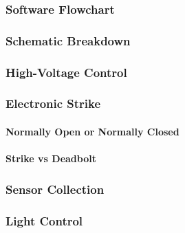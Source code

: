 \subsubsection{Software Flowchart}

\subsubsection{Schematic Breakdown}

\subsubsection{High-Voltage Control}

\subsubsection{Electronic Strike}
\label{sec:electronic-strike}

\paragraph{Normally Open or Normally Closed}

\paragraph{Strike vs Deadbolt}

\subsubsection{Sensor Collection}

\subsubsection{Light Control}

